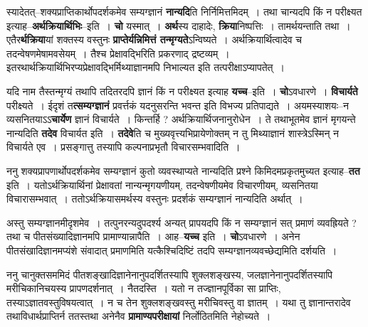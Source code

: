 \documentclass[article,12pt,a4paper]{memoir}
\begin{document}
	  \endgroup
	

	  \pstart स्यादेतत्--शक्यप्राप्तिकार्थोपदर्शकमेव सम्यग्ज्ञानं\leavevmode{} \textbf{नान्यदि}ति निर्निमित्तमिदम् । तथा चान्यदपि किं न परीक्ष्यत इत्याह--\textbf{अर्थक्रियार्थिभिः}--इति । \textbf{चो} यस्मात् । \textbf{अर्थ}स्य दाहादेः, \textbf{क्रिया}निष्पत्तिः । तामर्थयन्ताति तथा । एतैर\textbf{र्थक्रिया}यां शक्तस्य वस्तुनः \textbf{प्राप्तेर्यन्निमित्तं तन्मृग्यते}ऽन्विष्यते । अर्थक्रियार्थित्वादेव च तदन्वेषणमेषामवसेयम् । तैश्च प्रेक्षावद्भिरिति प्रकरणाद् द्रष्टव्यम् । इतरथार्थक्रियार्थिभिरप्यप्रेक्षावद्भिर्मिथ्याज्ञानमपि निभाल्यत इति तत्परीक्षाऽप्यापतेत् ।
	\pend
      

	  \pstart यदि नाम तैस्तन्मृग्यं तथापि तदितरदपि ज्ञानं किं न परीक्ष्यत इत्याह \textbf{यच्च}--इति । \textbf{चो}ऽवधारणे । \textbf{विचार्यते} परीक्ष्यते । ईदृशं त\textbf{त्सम्यग्ज्ञानं} प्रवर्त्तकं यदनुसरन्ति भवन्त इति विभज्य प्रतिपाद्यते । अयमस्याशयः--न व्यसनितयाऽऽ\textbf{चार्येण} ज्ञानं विचार्यते । किन्तर्हि ? अर्थक्रियार्थिजनानुरोधेन । ते तथाभूतमेव ज्ञानं मृगयन्ते नान्यदिति \textbf{तदेव} विचार्यत इति । \textbf{तदेवे}ति च मुख्यवृत्त्यभिप्रायेणोक्तम् न तु मिथ्याज्ञानं शास्त्रेऽस्मिन् न विचार्यते एव । प्रसङ्गात्तु तस्यापि कल्पनाप्रभृतौ विचारसम्भवादिति ।
	\pend
      

	  \pstart ननु शक्यप्रापणार्थोपदर्शकमेव सम्यग्ज्ञानं कुतो व्यवस्थाप्यते नान्यदिति प्रश्ने किमिदमप्रकृतमुच्यत इत्याह--\textbf{तत} इति । यतोऽर्थक्रियार्थिनां प्रेक्षावतां नान्यन्मृगयणीयम्, तदन्वेषणीयमेव विचारणीयम्, व्यसनितया विचारासम्भवात् । ततोऽर्थक्रियासमर्थस्य वस्तुनः प्रदर्शकं सम्यग्ज्ञानं नान्यदिति अर्थात् ।
	\pend
      

	  \pstart अस्तु सम्यग्ज्ञानमीदृशमेव । तत्पुनरन्यदुपदर्श्य अन्यत् प्रापयदपि किं न सम्यग्ज्ञानं सत् प्रमाणं व्यवह्रियते ? तथा च पीतसंख्यादिज्ञानमपि प्रामाण्यान्नापैति । आह--\textbf{यच्च} इति । \textbf{चो}ऽवधारणे । अनेन पीतसंखादिज्ञानमप्यंशे संवादात् प्रमाणमिति यत्कैश्चिदिष्टिं तदपि सम्यग्ज्ञानव्यवच्छेद्यमिति दर्शयति ।
	\pend
      

	  \pstart ननु चानुक्तसममिदं पीतशङ्खादिज्ञानेनानुपदर्शितस्यापि शुक्लशङ्खस्य, जलज्ञानेनानुपदर्शितस्यापि मरीचिकानिचयस्य प्रापणदर्शनात् । नैतदस्ति । यतो न तज्ज्ञानपूर्विका सा प्राप्तिः, तस्याऽज्ञातवस्तुविषयत्वात् । न च तेन शुक्लशङ्खवस्तु मरीचिवस्तु वा ज्ञातम् । यथा तु ज्ञानान्तरादेव तथाविधार्थप्राप्तिर्न ततस्तथा अनेनैव \textbf{प्रामाण्यपरीक्षायां} निर्लोठितमिति नेहोच्यते ।
	\pend
	  \bigskip
	  \begingroup
	
\end{document}
